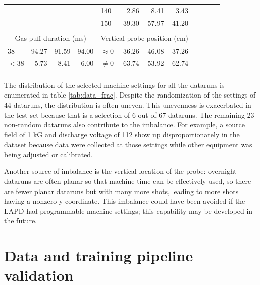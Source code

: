 \begin{table}
\begin{tabular}{lrrr|lrrr|lrrr}
                      & & & & 140 & 2.86 & 8.41 & 3.43     &                       & & & \\
                      & & & & 150 & 39.30 & 57.97 & 41.20  &                       & & & \\
		\\
		\multicolumn{4}{c|}{Gas puff duration (ms)} & \multicolumn{4}{c}{Vertical probe position (cm)}\\
		\cline{0-7} \cline{0-7}
		$38$ & 94.27 & 91.59 & 94.00 & $\approx 0$ & 36.26 & 46.08 & 37.26 & \\
		$<38$ & 5.73 & 8.41 & 6.00    & $\neq 0$ & 63.74 & 53.92 & 62.74    & \\
		\multicolumn{12}{l}{}
	\end{tabular}
\end{table}


The distribution of the selected machine settings for all the dataruns is enumerated in table \ref{tab:data_frac}. Despite the randomization of the settings of 44 dataruns, the distribution is often uneven. This unevenness is exacerbated in the test set because that is a selection of 6 out of 67 dataruns. The remaining 23 non-random dataruns also contribute to the imbalance. For example, a source field of 1 kG and discharge voltage of 112 show up disproportionately in the dataset because data were collected at those settings while other equipment was being adjusted or calibrated.

Another source of imbalance is the vertical location of the probe: overnight dataruns are often planar so that machine time can be effectively used, so there are fewer planar dataruns but with many more shots, leading to more shots having a nonzero y-coordinate. This imbalance could have been avoided if the LAPD had programmable machine settings; this capability may be developed in the future.

\section{Data and training pipeline validation}



